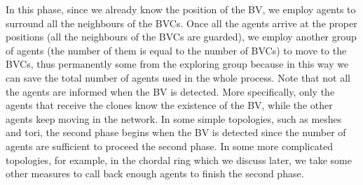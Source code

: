 In this phase, since we already know the position of the BV, we employ agents to surround all the neighbours of the BVCs. Once all the agents arrive  at the proper positions (all the neighbours of the BVCs are guarded), we employ another group of agents (the number of them is equal to the number of BVCs) to move to the BVCs, thus permanently  some from the  exploring group because in this way we can save the total number of agents used in the whole process. Note that not all the agents are informed when the BV is detected. More specifically, only the agents that receive the clones know the existence of the BV, while the other agents keep moving in the network. In some simple topologies, such as meshes and tori, the second phase begins when the BV is detected since the number of agents are sufficient to proceed the second phase. In some more complicated topologies, for example, in the chordal ring which we discuss later, we take some other measures to call back enough  agents to finish the second phase.

